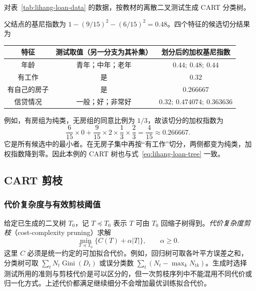 \begin{example}
\label{ex:lihang-loan-cart}
对表~\ref{tab:lihang-loan-data} 的数据，按教材的离散二叉测试生成 CART 分类树。
\end{example}
\begin{solve}
父结点的基尼指数为 $1-(9/15)^2-(6/15)^2=0.48$。四个特征的候选切分结果为
\begin{center}
  \begin{tabular}{ccc}
    \toprule
    特征 & 测试取值（另一分支为其补集） & 划分后的加权基尼指数 \\
    \midrule
    年龄 & 青年；中年；老年 & $0.44;\ 0.48;\ 0.44$ \\
    有工作 & 是 & $0.32$ \\
    有自己的房子 & 是 & $0.266667$ \\
    信贷情况 & 一般；好；非常好 & $0.32;\ 0.474074;\ 0.363636$ \\
    \bottomrule
  \end{tabular}
\end{center}
例如，有房组为纯类，无房组的同意比例为 $1/3$，故该切分的加权指数为
\[
  \frac6{15}\times0+\frac9{15}\times2\times\frac13\times\frac23
  =\frac4{15}\approx0.266667.
\]
它是所有候选中的最小者。在无房子集中再按“有工作”切分，两侧都变为纯类，加权指数降到零。因此本例的 CART 树也与式~\eqref{eq:lihang-loan-tree} 一致。
\end{solve}

\subsection{CART 剪枝}
\label{subsec:lihang-cart-pruning}

\subsubsection{代价复杂度与有效剪枝阈值}

给定已生成的二叉树 $T_0$，记 $T\preceq T_0$ 表示 $T$ 可由 $T_0$ 回缩子树得到。\emph{代价复杂度剪枝}（cost-complexity pruning）求解
\begin{equation}
  \min_{T\preceq T_0}\bigl\{C(T)+\alpha|T|\bigr\},\qquad\alpha\geq0.
  \label{eq:lihang-cart-cost-complexity}
\end{equation}
这里 $C$ 必须是统一约定的可加拟合代价。例如，回归树可取各叶平方误差之和，分类树可取 $\sum_tN_t\operatorname{Gini}(D_t)$ 或误分类数 $\sum_t(N_t-\max_kN_{tk})$。生成时选择测试所用的准则与剪枝代价是可以区分的，但一次剪枝序列中不能混用不同代价或归一化方式。上述代价都满足继续细分不会增加最优训练拟合代价。

